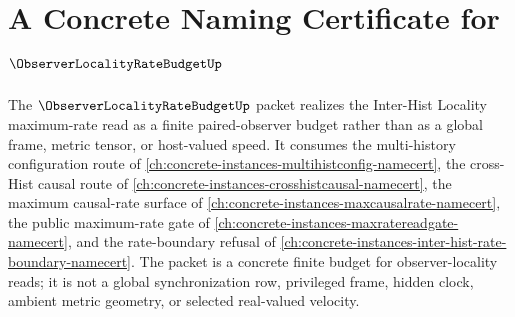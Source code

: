 \chapter{A Concrete Naming Certificate for $\ObserverLocalityRateBudgetUp$}
\label{ch:concrete-instances-observer-locality-rate-budget-namecert}

The $\ObserverLocalityRateBudgetUp$ packet realizes the Inter-Hist Locality maximum-rate read as a finite paired-observer budget rather than as a global frame, metric tensor, or host-valued speed. It consumes the multi-history configuration route of \autoref{ch:concrete-instances-multihistconfig-namecert}, the cross-Hist causal route of \autoref{ch:concrete-instances-crosshistcausal-namecert}, the maximum causal-rate surface of \autoref{ch:concrete-instances-maxcausalrate-namecert}, the public maximum-rate gate of \autoref{ch:concrete-instances-maxratereadgate-namecert}, and the rate-boundary refusal of \autoref{ch:concrete-instances-inter-hist-rate-boundary-namecert}. The packet is a concrete finite budget for observer-locality reads; it is not a global synchronization row, privileged frame, hidden clock, ambient metric geometry, or selected real-valued velocity.

